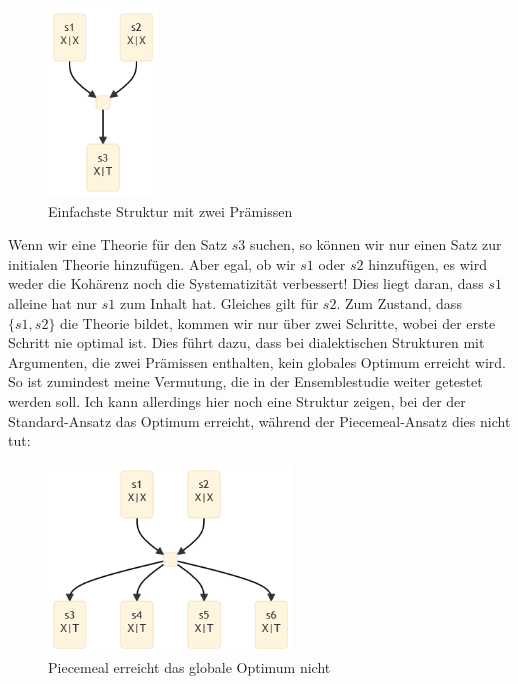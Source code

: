 \documentclass{article}
\begin{document}
\begin{figure}[ht]
  \centering
  \includegraphics[width=\textwidth,height=5cm,keepaspectratio]{images/2prem.png}
  \caption{Einfachste Struktur mit zwei Prämissen\label{fig:2prem}}
\end{figure}

Wenn wir eine Theorie für den Satz $s3$ suchen, so können wir nur einen Satz zur initialen Theorie hinzufügen. Aber egal, ob wir $s1$ oder $s2$ hinzufügen, es wird weder die Kohärenz noch die Systematizität verbessert! Dies liegt daran, dass $s1$ alleine hat nur $s1$ zum Inhalt hat. Gleiches gilt für $s2$. Zum Zustand, dass $\{s1,s2\}$ die Theorie bildet, kommen wir nur über zwei Schritte, wobei der erste Schritt nie optimal ist. Dies führt dazu, dass bei dialektischen Strukturen mit Argumenten, die zwei Prämissen enthalten, kein globales Optimum erreicht wird. So ist zumindest meine Vermutung, die in der Ensemblestudie weiter getestet werden soll. Ich kann allerdings hier noch eine Struktur zeigen, bei der der Standard-Ansatz das Optimum erreicht, während der Piecemeal-Ansatz dies nicht tut:

\begin{figure}[ht]
  \centering
  \includegraphics[width=\textwidth,height=5cm,keepaspectratio]{images/standard_better.png}
  \caption{Piecemeal erreicht das globale Optimum nicht\label{fig:standard_better}}
\end{figure}
\end{document}
